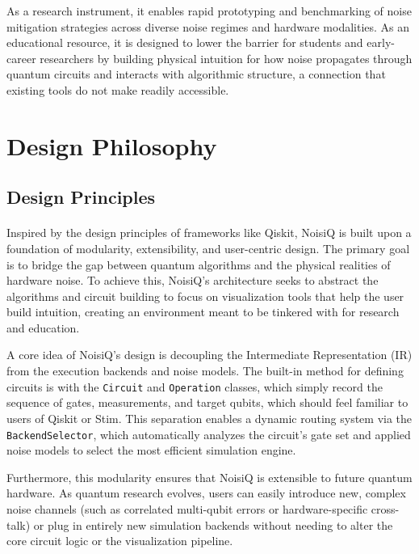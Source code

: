 \documentclass[10pt,twocolumn]{article}
\begin{document}
As a research instrument, it enables rapid prototyping and benchmarking of noise mitigation strategies
across diverse noise regimes and hardware modalities. As an educational
resource, it is designed to lower the barrier for students and early-career
researchers by building physical intuition for how noise propagates through
quantum circuits and interacts with algorithmic structure, a connection that
existing tools do not make readily accessible.

\section{Design Philosophy}
\label{sec:philosophy}
\subsection{Design Principles}
\label{subsec:principles}
\paragraph{}
    Inspired by the design principles of frameworks like Qiskit, NoisiQ is built upon a foundation of modularity, extensibility, and user-centric design. 
The primary goal is to bridge the gap between quantum algorithms and the physical realities of hardware noise. 
To achieve this, NoisiQ's architecture seeks to abstract the algorithms and circuit building to focus on visualization tools that help the user build intuition, creating an environment meant to be tinkered with for research and education.

A core idea of NoisiQ's design is decoupling the Intermediate Representation (IR) from the execution backends and noise models. 
The built-in method for defining circuits is with the \texttt{Circuit} and \texttt{Operation} classes, which simply record the sequence of gates, measurements, and target qubits, which should feel familiar to users of Qiskit or Stim. 
This separation enables a dynamic routing system via the \texttt{BackendSelector}, 
which automatically analyzes the circuit's gate set and applied noise models to select the most efficient simulation engine. 

Furthermore, this modularity ensures that NoisiQ is extensible to future quantum hardware. 
As quantum research evolves, users can easily introduce new, complex noise channels (such as correlated multi-qubit errors or hardware-specific cross-talk) 
or plug in entirely new simulation backends without needing to alter the core circuit logic or the visualization pipeline.
\end{document}
